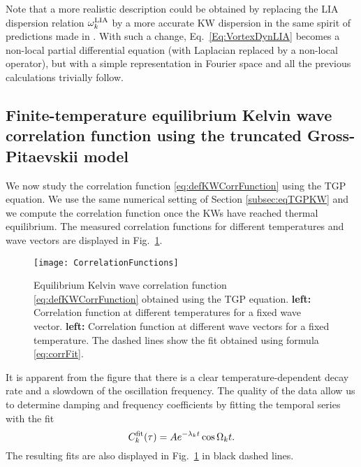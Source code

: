 \documentclass[sn-mathphys]{sn-jnl}%
\begin{document}
Note that a more realistic description could be obtained by replacing the LIA dispersion relation $\omega_k^{\rm LIA}$ by a more accurate KW dispersion in the same spirit of predictions made in \cite{Giuriato2020How}.  With such a change, Eq.~\eqref{Eq:VortexDynLIA} becomes a non-local partial differential equation (with Laplacian replaced by a non-local operator), but with a simple representation in Fourier space and all the previous calculations trivially follow.

\subsection{Finite-temperature equilibrium Kelvin wave correlation function using the truncated Gross-Pitaevskii model}\label{subsec:FiniteTemp_KW_in_GP}

We now study the correlation function \eqref{eq:defKWCorrFunction} using the TGP equation. We use the same numerical setting of Section \ref{subsec:eqTGPKW} and we compute the correlation function once the KWs have reached thermal equilibrium. The measured correlation functions for different temperatures and wave vectors are displayed in Fig.~\ref{fig:corrfunction}.
\begin{figure}[h]%
    \centering
    \texttt{[image: CorrelationFunctions]}
    \caption{Equilibrium Kelvin wave correlation function \eqref{eq:defKWCorrFunction} obtained using the TGP equation. \textbf{left:} Correlation function at different temperatures for a fixed wave vector. \textbf{left:} Correlation function at different wave vectors for a fixed temperature. The dashed lines show the fit obtained using formula \eqref{eq:corrFit}.}\label{fig:corrfunction}
\end{figure}
It is apparent from the figure that there is a clear temperature-dependent decay rate and a slowdown of the oscillation frequency. The quality of the data allow us to determine damping and frequency coefficients by fitting the temporal series with the fit
\begin{equation}\label{eq:corrFit}
    C_k^{\rm fit}(\tau)=A e^{-\lambda_k t}\cos{\Omega_k t}.
\end{equation}
The resulting fits are also displayed in Fig.~\ref{fig:corrfunction} in black dashed lines.
\end{document}
